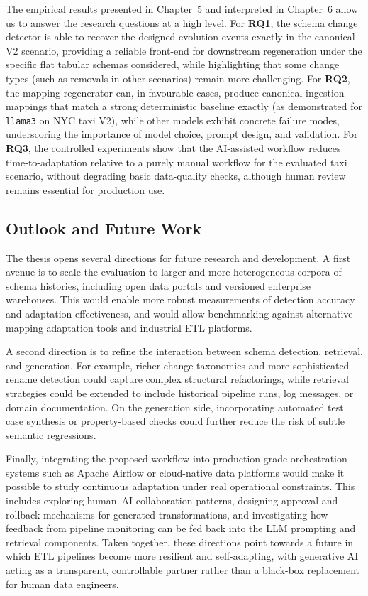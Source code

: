The empirical results presented in Chapter~5 and interpreted in Chapter~6 allow us to answer the research questions at a high level. For \textbf{RQ1}, the schema change detector is able to recover the designed evolution events exactly in the canonical--V2 scenario, providing a reliable front-end for downstream regeneration under the specific flat tabular schemas considered, while highlighting that some change types (such as removals in other scenarios) remain more challenging. For \textbf{RQ2}, the mapping regenerator can, in favourable cases, produce canonical ingestion mappings that match a strong deterministic baseline exactly (as demonstrated for \texttt{llama3} on NYC taxi V2), while other models exhibit concrete failure modes, underscoring the importance of model choice, prompt design, and validation. For \textbf{RQ3}, the controlled experiments show that the AI-assisted workflow reduces time-to-adaptation relative to a purely manual workflow for the evaluated taxi scenario, without degrading basic data-quality checks, although human review remains essential for production use.

\subsection{Outlook and Future Work}

The thesis opens several directions for future research and development. A first avenue is to scale the evaluation to larger and more heterogeneous corpora of schema histories, including open data portals and versioned enterprise warehouses. This would enable more robust measurements of detection accuracy and adaptation effectiveness, and would allow benchmarking against alternative mapping adaptation tools and industrial ETL platforms.

A second direction is to refine the interaction between schema detection, retrieval, and generation. For example, richer change taxonomies and more sophisticated rename detection could capture complex structural refactorings, while retrieval strategies could be extended to include historical pipeline runs, log messages, or domain documentation. On the generation side, incorporating automated test case synthesis or property-based checks could further reduce the risk of subtle semantic regressions.

Finally, integrating the proposed workflow into production-grade orchestration systems such as Apache Airflow or cloud-native data platforms would make it possible to study continuous adaptation under real operational constraints. This includes exploring human--AI collaboration patterns, designing approval and rollback mechanisms for generated transformations, and investigating how feedback from pipeline monitoring can be fed back into the LLM prompting and retrieval components. Taken together, these directions point towards a future in which ETL pipelines become more resilient and self-adapting, with generative AI acting as a transparent, controllable partner rather than a black-box replacement for human data engineers.
